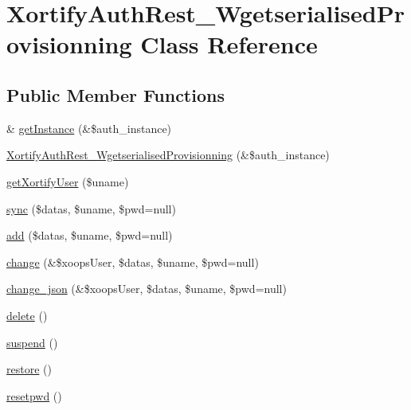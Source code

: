 \hypertarget{class_xortify_auth_rest___wgetserialised_provisionning}{\section{Xortify\-Auth\-Rest\-\_\-\-Wgetserialised\-Provisionning Class Reference}
\label{class_xortify_auth_rest___wgetserialised_provisionning}
}
\subsection*{Public Member Functions}
\begin{DoxyCompactItemize}
\item 
\& \hyperlink{class_xortify_auth_rest___wgetserialised_provisionning_a2c8eaa915c70d75289ac8a03686194f9}{get\-Instance} (\&\$auth\-\_\-instance)
\item 
\hyperlink{class_xortify_auth_rest___wgetserialised_provisionning_a527aad8711de2a1c67cb93b4621b1fb3}{Xortify\-Auth\-Rest\-\_\-\-Wgetserialised\-Provisionning} (\&\$auth\-\_\-instance)
\item 
\hyperlink{class_xortify_auth_rest___wgetserialised_provisionning_a041d726ac26672547ed1504e8e0117aa}{get\-Xortify\-User} (\$uname)
\item 
\hyperlink{class_xortify_auth_rest___wgetserialised_provisionning_a35dc08b0f2138eb818ff95345b73bcff}{sync} (\$datas, \$uname, \$pwd=null)
\item 
\hyperlink{class_xortify_auth_rest___wgetserialised_provisionning_adfc9fcef01e7bd7b2f47e8e79d51fc63}{add} (\$datas, \$uname, \$pwd=null)
\item 
\hyperlink{class_xortify_auth_rest___wgetserialised_provisionning_ae1f0971b9712c794620cf309164e43af}{change} (\&\$xoops\-User, \$datas, \$uname, \$pwd=null)
\item 
\hyperlink{class_xortify_auth_rest___wgetserialised_provisionning_a94f4e0408f26e65abca347ec883f4ec9}{change\-\_\-json} (\&\$xoops\-User, \$datas, \$uname, \$pwd=null)
\item 
\hyperlink{class_xortify_auth_rest___wgetserialised_provisionning_a13bdffdd926f26b825ea57066334ff01}{delete} ()
\item 
\hyperlink{class_xortify_auth_rest___wgetserialised_provisionning_ad73006a505121228f3b075c2409787d2}{suspend} ()
\item 
\hyperlink{class_xortify_auth_rest___wgetserialised_provisionning_aa1371f22826cf8cde4454c9b467203d0}{restore} ()
\item 
\hyperlink{class_xortify_auth_rest___wgetserialised_provisionning_a06d70fbd3a2db390b6f2530c0076628e}{resetpwd} ()
\end{DoxyCompactItemize}
